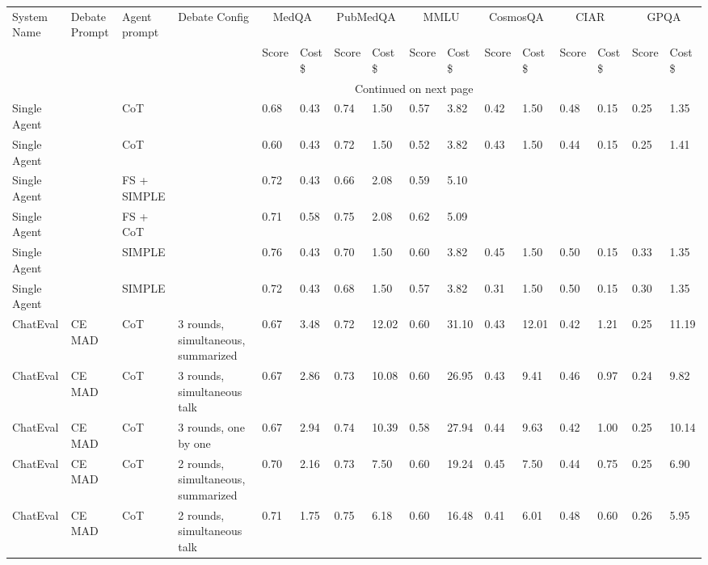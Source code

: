 \small
\begin{landscape}

\begin{longtable}{p{2cm}p{1.5cm}p{1cm}p{2.5cm}llllllllllll}
\toprule

System Name & Debate Prompt & Agent prompt & Debate Config &
\multicolumn{2}{c}{MedQA} & \multicolumn{2}{c}{PubMedQA} & \multicolumn{2}{c}{MMLU} & \multicolumn{2}{c}{CosmosQA} & \multicolumn{2}{c}{CIAR} & \multicolumn{2}{c}{GPQA} \\
 &   &    &   & Score & Cost \$ & Score & Cost \$ & Score & Cost \$ & Score & Cost
 \$ & Score & Cost \$ & Score & Cost \$  \\
\midrule
\endhead
\midrule
\multicolumn{10}{r}{Continued on next page} \\
\midrule
\endfoot
\bottomrule
\endlastfoot
Single Agent &   & CoT &  & 0.68 & 0.43 & 0.74 & 1.50 & 0.57 & 3.82 & 0.42 & 1.50 & 0.48 & 0.15 & 0.25 & 1.35 \\
Single Agent &   & CoT &  & 0.60 & 0.43 & 0.72 & 1.50 & 0.52 & 3.82 & 0.43 & 1.50 & 0.44 & 0.15 & 0.25 & 1.41 \\
Single Agent &   & FS + SIMPLE &  & 0.72 & 0.43 & 0.66 & 2.08 & 0.59 & 5.10 &  &  &  &  &  &  \\
Single Agent &   & FS + CoT &  & 0.71 & 0.58 & 0.75 & 2.08 & 0.62 & 5.09 &  &  &  &  &  &  \\
Single Agent &   & SIMPLE &  & 0.76 & 0.43 & 0.70 & 1.50 & 0.60 & 3.82 & 0.45 & 1.50 & 0.50 & 0.15 & 0.33 & 1.35 \\
Single Agent &   & SIMPLE &  & 0.72 & 0.43 & 0.68 & 1.50 & 0.57 & 3.82 & 0.31 & 1.50 & 0.50 & 0.15 & 0.30 & 1.35 \\
ChatEval & CE MAD & CoT & 3 rounds, simultaneous, summarized & 0.67 & 3.48 & 0.72 & 12.02 & 0.60 & 31.10 & 0.43 & 12.01 & 0.42 & 1.21 & 0.25 & 11.19 \\
ChatEval & CE MAD & CoT & 3 rounds, simultaneous talk & 0.67 & 2.86 & 0.73 & 10.08 & 0.60 & 26.95 & 0.43 & 9.41 & 0.46 & 0.97 & 0.24 & 9.82 \\
ChatEval & CE MAD & CoT & 3 rounds, one by one & 0.67 & 2.94 & 0.74 & 10.39 & 0.58 & 27.94 & 0.44 & 9.63 & 0.42 & 1.00 & 0.25 & 10.14 \\
ChatEval & CE MAD & CoT & 2 rounds, simultaneous, summarized & 0.70 & 2.16 & 0.73 & 7.50 & 0.60 & 19.24 & 0.45 & 7.50 & 0.44 & 0.75 & 0.25 & 6.90 \\
ChatEval & CE MAD & CoT & 2 rounds, simultaneous talk & 0.71 & 1.75 & 0.75 & 6.18 & 0.60 & 16.48 & 0.41 & 6.01 & 0.48 & 0.60 & 0.26 & 5.95 \\

\end{longtable}
\end{landscape}
